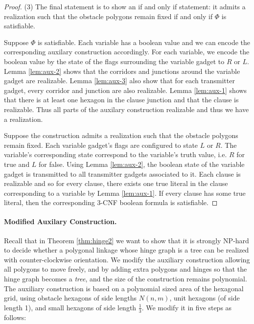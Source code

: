 \documentclass[10pt]{CSUNthesis}
\theoremstyle{plain}%
\theoremstyle{definition}
\theoremstyle{remark}
\begin{document}
\begin{proof}
\noindent (3) The final statement is to show an if and only if statement: it admits a realization such that the obstacle polygons remain fixed if and only if $\Phi$ is satisfiable.

Suppose $\Phi$ is satisfiable.  %
Each variable has a boolean value and we can encode the corresponding auxilary construction accordingly.  
For each variable, we encode the boolean value by the state of the flags surrounding the variable gadget to $R$ or $L$.  
Lemma \ref{lem:aux-2} shows that the corridors and junctions around the variable gadget are realizable.
Lemma \ref{lem:aux-3} also show that for each transmitter gadget, every corridor and junction are also realizable. 
Lemma \ref{lem:aux-1} shows that there is at least one hexagon in the clause junction and that the clause is realizable.
Thus all parts of the auxilary construction realizable and thus we have a realization.

Suppose the construction admits a realization such that the obstacle polygons remain fixed.
Each variable gadget's flags are configured to state $L$ or $R$. 
The variable's corresponding state correspond to the variable's truth value, i.e. $R$ for true and $L$ for false.
Using Lemma \ref{lem:aux-2}, the boolean state of the variable gadget is transmitted to all transmitter gadgets associated to it.
Each clause is realizable and so for every clause, there exists one true literal in the clause corresponding to a variable by Lemma \ref{lem:aux-1}. 
If every clause has some true literal, then the corresponding 3-CNF boolean formula is satisfiable.
\end{proof}
\paragraph{Modified Auxilary Construction.}


Recall that in Theorem \ref{thm:hinge2} we want to show that it is strongly NP-hard to decide whether a polygonal linkage whose hinge graph is a tree can be realized with counter-clockwise orientation.
We modify the auxiliary construction allowing all polygons to move freely, and by adding extra polygons and hinges so that the hinge graph becomes a \emph{tree}, and the size of the construction remains polynomial. 
The auxiliary construction is based on a polynomial sized area of the hexagonal grid, using obstacle hexagons of side lengths $N(n,m)$, unit hexagons (of side length 1), and small hexagons of side length $\frac{1}{3}$. 
We modify it in five steps as follows:
\end{document}
